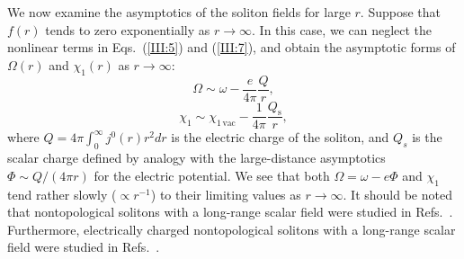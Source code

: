 We now  examine  the  asymptotics   of   the   soliton  fields  for  large $r$.
Suppose that  $f(r)$  tends  to  zero  exponentially as $r \rightarrow \infty$.
In this case,  we  can  neglect  the  nonlinear terms in Eqs.~(\ref{III:5}) and
(\ref{III:7}), and obtain the asymptotic forms of $\Omega(r)$ and $\chi_{1}(r)$
as $r \rightarrow \infty$:
\begin{equation}
\Omega \sim \omega -\frac{e}{4\pi}\frac{Q}{r},                   \label{III:15}
\end{equation}
\begin{equation}
\chi _{1}\sim \chi _{1\,\text{vac}}-\frac{1}{4\pi }\frac{Q_{\text{s}}}{r},
                                                                 \label{III:16}
\end{equation}
where $Q = 4 \pi \int\nolimits_{0}^{\infty }j^{0}(r)r^{2}dr$  is  the  electric
charge of the soliton, and $Q_{s}$ is the scalar charge defined by analogy with
the large-distance asymptotics $\Phi\sim Q/(4\pi r)$ for the electric potential.
We see that both $\Omega=\omega-e\Phi$ and $\chi_1$ tend rather slowly ($\propto
r^{-1}$) to their limiting values as $r \rightarrow \infty$.
It should be noted that nontopological solitons with  a long-range scalar field
were studied in Refs.~\cite{lgn_pan_2010, lr_mpla_2011, lpshnir_2018}.
Furthermore, electrically  charged  nontopological  solitons  with a long-range
scalar   field   were    studied    in    Refs.~\cite{lshnir_2019, lshnir_2022,
 kunzlsh_2022}.


